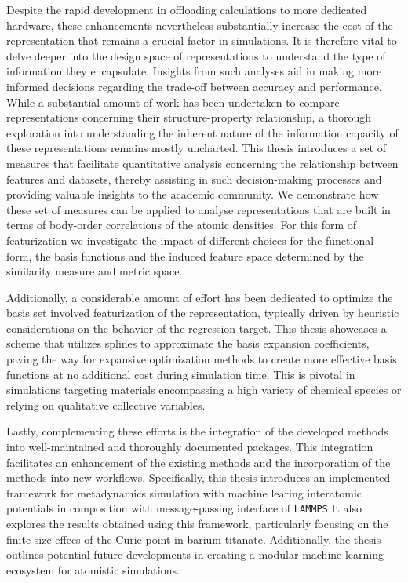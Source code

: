 %
Despite the rapid development in offloading calculations to more dedicated hardware,
these enhancements nevertheless substantially increase the cost of the
representation that remains a crucial factor in simulations.  It is therefore
vital to delve deeper into the design space of representations to understand
the type of information they encapsulate.  Insights from such analyses aid in
making more informed decisions regarding the trade-off between accuracy and
performance.
While a substantial amount of work has been undertaken to compare
representations concerning their structure-property relationship, a thorough
exploration into understanding the inherent nature of the information capacity
of these representations remains mostly uncharted.
This thesis introduces a
set of measures that facilitate quantitative analysis concerning the
relationship between features and datasets, thereby assisting in such
decision-making processes and providing valuable insights to the academic community.
We demonstrate how these set of measures can be applied to analyse 
representations that are built in terms of body-order correlations of the atomic densities.
For this form of featurization we investigate the impact of different choices for the functional form, the basis functions and the induced feature space determined by the similarity measure and metric space.

Additionally, a considerable amount of effort has been dedicated to
optimize the basis set involved featurization of the  representation, typically driven by
heuristic considerations on the behavior of the regression target.  This thesis
showcases a scheme that utilizes splines to approximate the basis expansion
coefficients, paving the way for expansive optimization methods to create more
effective basis functions at no additional cost during simulation time.  This
is pivotal in simulations targeting materials encompassing a high variety of
chemical species or relying on qualitative collective variables.

Lastly, complementing these efforts is the integration of the developed methods into well-maintained and thoroughly documented packages.
This integration facilitates an enhancement of the existing methods and the incorporation of the methods into new workflows.
Specifically, this thesis introduces an implemented framework for metadynamics simulation with machine learing interatomic potentials in composition with message-passing interface of \texttt{LAMMPS}
It also explores the results obtained using this framework, particularly focusing on the finite-size effecs of the Curie point in barium titanate.
Additionally, the thesis outlines potential future developments in creating a modular machine learning ecosystem for atomistic simulations.


